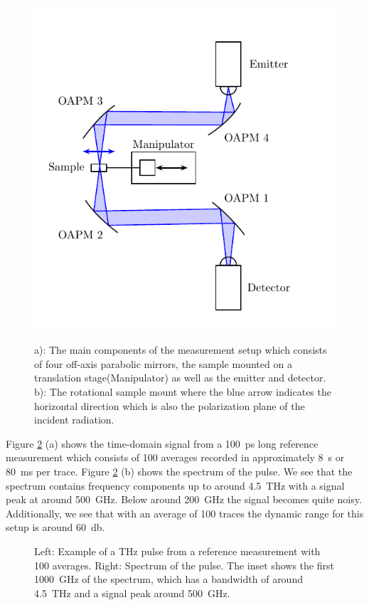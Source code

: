 \begin{figure}[H]
    \centering
    \subcaptionbox{\label{fig:1}}
        {\hspace*{-2em}\includegraphics[width=0.5\linewidth]{images/3_chapter03/Setup-THz-TDS-HHI.pdf}}
    \qquad
    \subcaptionbox{\label{fig:2}}
        {\hspace*{-2em}}
    
    \caption{a): The main components of the measurement setup which consists of four off-axis parabolic mirrors, the sample mounted on a translation stage(Manipulator) as well as the emitter and detector. b): The rotational sample mount where the blue arrow indicates the horizontal direction which is also the polarization plane of the incident radiation.}
    \label{fig:3_THz-TDS-HHI}
\end{figure}

Figure \ref{fig:HHI_pulse_example} (a) shows the time-domain signal from a \SI{100}{\pico \second} long reference measurement which consists of 100 averages recorded in approximately \SI{8}{\second} or \SI{80}{\milli \second} per trace. Figure \ref{fig:HHI_pulse_example} (b) shows the spectrum of the pulse. We see that the spectrum contains frequency components up to around \SI{4.5}{\tera \hertz} with a signal peak at around \SI{500}{\giga \hertz}. Below around \SI{200}{\giga \hertz} the signal becomes quite noisy. Additionally, we see that with an average of 100 traces the dynamic range for this setup is around \SI{60}{\decibel}.

\begin{figure}[H]
    \centering
    
    \caption{Left: Example of a THz pulse from a reference measurement with 100 averages. Right: Spectrum of the pulse. The inset shows the first \SI{1000}{\giga \hertz} of the spectrum, which has a bandwidth of around \SI{4.5}{\tera \hertz} and a signal peak around \SI{500}{\giga \hertz}.}
    \label{fig:HHI_pulse_example}
\end{figure}

